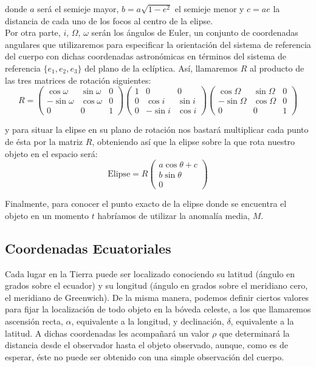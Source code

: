 \documentclass[11pt]{article}
\begin{document}
\noindent donde $a$ será el semieje mayor, $b=a\sqrt{1-e^2}$ el semieje menor y $c=ae$ la distancia de cada uno de los focos al centro de la elipse.\\

Por otra parte, $i$, $\Omega$, $\omega$ serán los ángulos de Euler, un conjunto de coordenadas angulares que utilizaremos para especificar la orientación del sistema de referencia del cuerpo con dichas coordenadas astronómicas en términos del sistema de referencia $\{e_1,e_2,e_3\}$ del plano de la eclíptica. Así, llamaremos $R$ al producto de las tres matrices de rotación siguientes:
\[
R=
\left(
\begin{array}{ccc}
	\cos{\omega} & \sin{\omega} & 0 \\
	-\sin{\omega} & \cos{\omega} & 0 \\
	0 & 0 & 1
\end{array}
\right)
\left(
\begin{array}{ccc}
	1 & 0 & 0 \\
	0 & \cos{i} & \sin{i} \\
	0 & -\sin{i} & \cos{i}
\end{array}
\right)
\left(
\begin{array}{ccc}
	\cos{\Omega} & \sin{\Omega} & 0 \\
	-\sin{\Omega} & \cos{\Omega} & 0 \\
	0 & 0 & 1
\end{array}
\right)
\]

\noindent y para situar la elipse en su plano de rotación nos bastará multiplicar cada punto de ésta por la matriz $R$, obteniendo así que la elipse sobre la que rota nuestro objeto en el espacio será:
\[
\text{Elipse}=R
\left(
\begin{array}{c}
a\cos{\theta}+c \\ b\sin{\theta} \\ 0
\end{array}
\right)
\]

Finalmente, para conocer el punto exacto de la elipse donde se encuentra el objeto en un momento $t$ habríamos de utilizar la anomalía media, $M$.\\


\subsection{Coordenadas Ecuatoriales}
\label{subsec:equatorial_coordinates}
Cada lugar en la Tierra puede ser localizado conociendo su latitud (ángulo en grados sobre el ecuador) y su longitud (ángulo en grados sobre el meridiano cero, el meridiano de Greenwich). De la misma manera, podemos definir ciertos valores para fijar la localización de todo objeto en la bóveda celeste, a los que llamaremos ascensión recta, $\alpha$, equivalente a la longitud, y declinación, $\delta$, equivalente a la latitud. A dichas coordenadas les acompañará un valor $\rho$ que determinará la distancia desde el observador hasta el objeto observado, aunque, como es de esperar, éste no puede ser obtenido con una simple observación del cuerpo.\\
\end{document}
